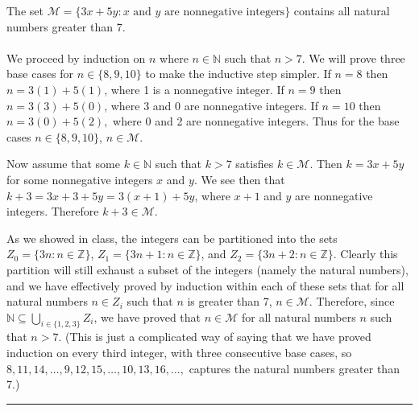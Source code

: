\documentclass[11pt]{hmcpset}
\newenvironment{problem1}[1]{\noindent {\bf Problem #1}}
{\medskip}
\newenvironment{proof}{\noindent {\bf Proof:} \\}{\hfill
\rule{1mm}{3mm} \bigskip}
\begin{document}
\begin{problem1}{6(a)} The set $\mathcal{M}=\{3x+5y : \text{$x$ and $y$ are nonnegative integers}\}$ contains all natural numbers greater than 7.\\
\begin{proof}\indent We proceed by induction on $n$ where $n\in\mathbb{N}$ such that $n>7$. We will prove three base cases for $n\in\{8,9,10\}$ to make the inductive step simpler. If $n=8$ then $n=3(1)+5(1)$, where 1 is a nonnegative integer. If $n=9$ then $n=3(3)+5(0)$, where 3 and 0 are nonnegative integers. If $n=10$ then $n=3(0)+5(2),$ where 0 and 2 are nonnegative integers. Thus for the base cases $n\in \{8,9,10\}$, $n\in \mathcal{M}$.

Now assume that some $k\in\mathbb{N}$ such that $k>7$ satisfies $k\in\mathcal{M}$. Then $k=3x+5y$ for some nonnegative integers $x$ and $y$. We see then that $k+3=3x+3+5y=3(x+1)+5y$, where $x+1$ and $y$ are nonnegative integers. Therefore $k+3\in\mathcal{M}$.

As we showed in class, the integers can be partitioned into the sets $Z_0=\{3n:n\in\mathbb{Z}\}$, $Z_1=\{3n+1:n\in\mathbb{Z}\}$, and $Z_2=\{3n+2:n\in\mathbb{Z}\}$. Clearly this partition will still exhaust a subset of the integers (namely the natural numbers), and we have effectively proved by induction within each of these sets that for all natural numbers $n\in Z_i$ such that $n$ is greater than 7, $n\in\mathcal{M}$. Therefore, since $\mathbb{N}\subseteq\bigcup_{i\in\{1,2,3\}} Z_i$, we have proved that $n\in\mathcal{M}$ for all natural numbers $n$ such that $n>7$. (This is just a complicated way of saying that we have proved induction on every third integer, with three consecutive base cases, so $8,11,14,\ldots,9,12,15,\ldots,10,13,16,\ldots,$ captures the natural numbers greater than 7.)

\end{proof}
\end{problem1}
\end{document}
